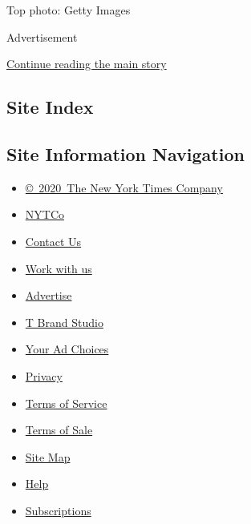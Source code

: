 Top photo: Getty Images

Advertisement

\protect\hyperlink{after-bottom}{Continue reading the main story}

\hypertarget{site-index}{%
\subsection{Site Index}\label{site-index}}

\hypertarget{site-information-navigation}{%
\subsection{Site Information
Navigation}\label{site-information-navigation}}

\begin{itemize}
\tightlist
\item
  \href{https://help.nytimes3xbfgragh.onion/hc/en-us/articles/115014792127-Copyright-notice}{©~2020~The
  New York Times Company}
\end{itemize}

\begin{itemize}
\tightlist
\item
  \href{https://www.nytco.com/}{NYTCo}
\item
  \href{https://help.nytimes3xbfgragh.onion/hc/en-us/articles/115015385887-Contact-Us}{Contact
  Us}
\item
  \href{https://www.nytco.com/careers/}{Work with us}
\item
  \href{https://nytmediakit.com/}{Advertise}
\item
  \href{http://www.tbrandstudio.com/}{T Brand Studio}
\item
  \href{https://www.nytimes3xbfgragh.onion/privacy/cookie-policy\#how-do-i-manage-trackers}{Your
  Ad Choices}
\item
  \href{https://www.nytimes3xbfgragh.onion/privacy}{Privacy}
\item
  \href{https://help.nytimes3xbfgragh.onion/hc/en-us/articles/115014893428-Terms-of-service}{Terms
  of Service}
\item
  \href{https://help.nytimes3xbfgragh.onion/hc/en-us/articles/115014893968-Terms-of-sale}{Terms
  of Sale}
\item
  \href{https://spiderbites.nytimes3xbfgragh.onion}{Site Map}
\item
  \href{https://help.nytimes3xbfgragh.onion/hc/en-us}{Help}
\item
  \href{https://www.nytimes3xbfgragh.onion/subscription?campaignId=37WXW}{Subscriptions}
\end{itemize}
